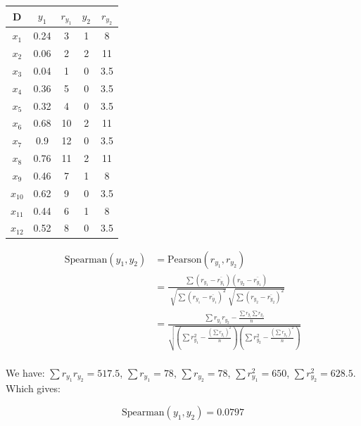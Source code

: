 \documentclass[12pt]{article}
\begin{document}
\begin{enumerate}[leftmargin=\labelsep]
\begin{center}
    \begin{tabular}{|c | c | c | c | c|}
        \hline
        D & $y_1$ & $r_{y_1}$ & $y_2$ & $r_{y_2}$\\
        \hline
        $x_1$    & 0.24 & 3  & 1 & 8 \\
        $x_2$    & 0.06 & 2  & 2 & 11 \\
        $x_3$    & 0.04 & 1  & 0 & 3.5 \\
        $x_4$    & 0.36 & 5  & 0 & 3.5 \\
        $x_5$    & 0.32 & 4  & 0 & 3.5 \\
        $x_6$    & 0.68 & 10 & 2 & 11 \\
        $x_7$    & 0.9  & 12 & 0 & 3.5 \\
        $x_8$    & 0.76 & 11 & 2 & 11 \\
        $x_9$    & 0.46 & 7  & 1 & 8 \\
        $x_{10}$ & 0.62 & 9  & 0 & 3.5 \\
        $x_{11}$ & 0.44 & 6  & 1 & 8 \\
        $x_{12}$ & 0.52 & 8  & 0 & 3.5 \\
        \hline
    \end{tabular}
\end{center}

    \begin{equation}
        \begin{split}
            \textrm{Spearman}(y_1, y_2) & = \textrm{Pearson}(r_{y_1}, r_{y_2}) \\
            & = \frac{\sum (r_{y_1}-\overline{r_{y_1}})(r_{y_2}-\overline{r_{y_1}})}{\sqrt[]{\sum (r_{y_1}-\overline{r_{y_1}})^2}\sqrt[]{\sum (r_{y_2}-\overline{r_{y_2}})^2}} \\
            & = \frac{\sum r_{y_1}r_{y_2} - \frac{\sum r_{y_1} \sum r_{y_2}}{n}}{\sqrt{(\sum r_{y_1}^2-\frac{(\sum r_{y_1})^2}{n})(\sum r_{y_2}^2-\frac{(\sum r_{y_2})^2}{n })}}
        \end{split}
    \end{equation}

    \paragraph{}We have: $\sum r_{y_1}r_{y_2} = 517.5$, $\sum r_{y_1} = 78$, $\sum r_{y_2} = 78$, $\sum r_{y_1}^2 = 650$, $\sum r_{y_2}^2 = 628.5$. Which gives: 
        
    \begin{equation}
        \textrm{Spearman}(y_1, y_2) = 0.0797
    \end{equation}


\end{enumerate}
\end{document}
